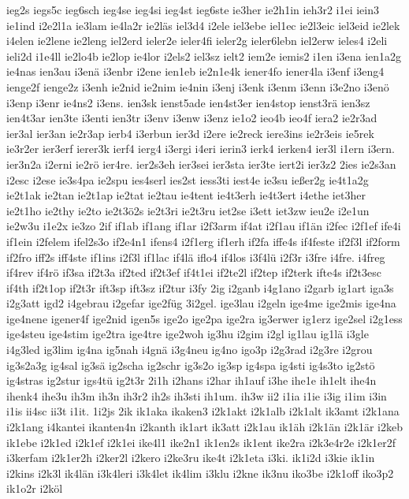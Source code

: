 {ieg2s
iegs5c
ieg6sch
ieg4se
ieg4si
ieg4st
ieg6ste
ie3her
ie2h1in
ieh3r2
i1ei
iein3
ie1ind
i2e2l1a
ie3lam
ie4la2r
ie2läs
iel3d4
i2ele
iel3ebe
iel1ec
ie2l3eic
iel3eid
ie2lek
i4elen
ie2lene
ie2leng
iel2erd
ieler2e
ieler4fi
ieler2g
ieler6lebn
iel2erw
ieles4
i2eli
ieli2d
i1e4ll
ie2lo4b
ie2lop
ie4lor
i2els2
iel3sz
ielt2
iem2e
iemis2
i1en
i3ena
ien1a2g
ie4nas
ien3au
i3enä
i3enbr
i2ene
ien1eb
ie2n1e4k
iener4fo
iener4la
i3enf
i3eng4
ienge2f
ienge2z
i3enh
ie2nid
ie2nim
ie4nin
i3enj
i3enk
i3enm
i3enn
i3e2no
i3enö
i3enp
i3enr
ie4ns2
i3ens.
ien3sk
ienst5ade
ien4st3er
ien4stop
ienst3rä
ien3sz
ien4t3ar
ien3te
i3enti
ien3tr
i3env
i3enw
i3enz
ie1o2
ieo4b
ieo4f
iera2
ie2r3ad
ier3al
ier3an
ie2r3ap
ierb4
i3erbun
ier3d
i2ere
ie2reck
iere3ins
ie2r3eis
ie5rek
ie3r2er
ier3erf
ierer3k
ierf4
ierg4
i3ergi
i4eri
ierin3
ierk4
ierken4
ier3l
i1ern
i3ern.
ier3n2a
i2erni
ie2rö
ier4re.
ier2s3eh
ier3sei
ier3sta
ier3te
iert2i
ier3z2
2ies
ie2s3an
i2esc
i2ese
ie3s4pa
ie2spu
ies4serl
ies2st
iess3ti
iest4e
ie3su
ießer2g
ie4t1a2g
ie2t1ak
ie2tan
ie2t1ap
ie2tat
ie2tau
ie4tent
ie4t3erh
ie4t3ert
i4ethe
iet3her
ie2t1ho
ie2thy
ie2to
ie2t3ö2s
ie2t3ri
ie2t3ru
iet2se
i3ett
iet3zw
ieu2e
i2e1un
ie2w3u
i1e2x
ie3zo
2if
if1ab
if1ang
if1ar
i2f3arm
if4at
i2f1au
if1än
i2fec
i2f1ef
ife4i
if1ein
i2felem
ifel2s3o
if2e4n1
ifens4
i2f1erg
if1erh
if2fa
iffe4s
if4feste
if2f3l
if2form
if2fro
iff2s
iff4ste
if1ins
i2f3l
if1lac
if4lä
iflo4
if4los
i3f4lü
i2f3r
i3fre
i4fre.
i4freg
if4rev
if4rö
if3sa
if2t3a
if2ted
if2t3ef
if4t1ei
if2te2l
if2tep
if2terk
ifte4s
if2t3esc
if4th
if2t1op
if2t3r
ift3sp
ift3sz
if2tur
i3fy
2ig
i2ganb
i4g1ano
i2garb
ig1art
iga3s
i2g3att
igd2
i4gebrau
i2gefar
ige2füg
3i2gel.
ige3lau
i2geln
ige4me
ige2mis
ige4na
ige4nene
igener4f
ige2nid
igen5s
ige2o
ige2pa
ige2ra
ig3erwer
ig1erz
ige2sel
i2g1ess
ige4steu
ige4stim
ige2tra
ige4tre
ige2woh
ig3hu
i2gim
i2gl
ig1lau
ig1lä
i3gle
i4g3led
ig3lim
ig4na
ig5nah
i4gnä
i3g4neu
ig4no
igo3p
i2g3rad
i2g3re
i2grou
ig3s2a3g
ig4sal
ig3sä
ig2scha
ig2schr
ig3s2o
ig3sp
ig4spa
ig4sti
ig4s3to
ig2stö
ig4stras
ig2stur
igs4tü
ig2t3r
2i1h
i2hans
i2har
ih1auf
i3he
ihe1e
ih1elt
ihe4n
ihenk4
ihe3u
ih3m
ih3n
ih3r2
ih2s
ih3sti
ih1um.
ih3w
ii2
i1ia
i1ie
i3ig
i1im
i3in
i1is
ii4sc
ii3t
i1it.
1i2js
2ik
ik1aka
ikaken3
i2k1akt
i2k1alb
i2k1alt
ik3amt
i2k1ana
i2k1ang
i4kantei
ikanten4n
i2kanth
ik1art
ik3att
i2k1au
ik1äh
i2k1än
i2k1är
i2keb
ik1ebe
i2k1ed
i2k1ef
i2k1ei
ike4l1
ike2n1
ik1en2s
ik1ent
ike2ra
i2k3e4r2e
i2k1er2f
i3kerfam
i2k1er2h
i2ker2l
i2kero
i2ke3ru
ike4t
i2k1eta
i3ki.
ik1i2d
i3kie
ik1in
i2kins
i2k3l
ik4län
i3k4leri
i3k4let
ik4lim
i3klu
i2kne
ik3nu
iko3be
i2k1off
iko3p2
ik1o2r
i2köl
}
